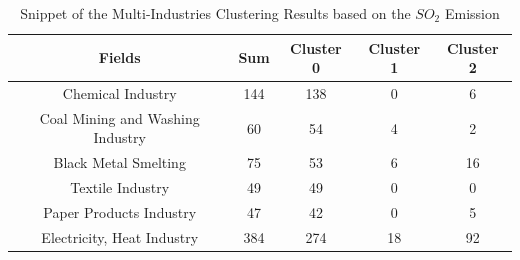 \begin{table}[h]
    \centering
    \begin{tabular}{c|c|c|c|c}
        \textbf{Fields} & \textbf{Sum} & \textbf{Cluster 0} & \textbf{Cluster 1} & \textbf{Cluster 2} \\
        \hline
        Chemical Industry & 144 & 138 & 0 & 6 \\
        Coal Mining and Washing Industry & 60 & 54 & 4 & 2 \\
        Black Metal Smelting & 75 & 53 & 6 & 16 \\
        Textile Industry & 49 & 49 & 0 & 0 \\
        Paper Products Industry & 47 & 42 & 0 & 5 \\
        Electricity, Heat Industry & 384 & 274 & 18 & 92 \\
    \end{tabular}
    \caption{Snippet of the Multi-Industries Clustering Results based on the $SO_2$ Emission \cite{LIU-BDE}}
    \label{tab:multi_industries_clustering_results_based_on_the_so2_emission}
\end{table}




